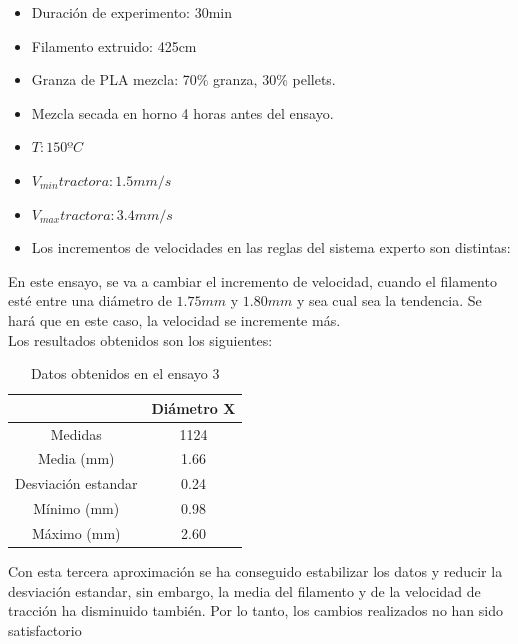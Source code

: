 \begin{itemize}
	\item{Duración de experimento: 30min}
	\item{Filamento extruido: 425cm}
	\item{Granza de PLA mezcla: 70\% granza, 30\% pellets.}
	\item{Mezcla secada en horno 4 horas antes del ensayo.}
	\item{$T: 150ºC$}
	\item{$V_{min} tractora: 1.5 mm/s$}
	\item{$V_{max} tractora: 3.4 mm/s$}
	\item{Los incrementos de velocidades en las reglas del sistema experto son distintas:}
\end{itemize}

En este ensayo, se va a cambiar el incremento de velocidad, cuando el filamento esté entre una diámetro de $1.75 mm$ y $1.80 mm$ y sea cual sea la tendencia. Se hará que en este caso, la velocidad se incremente más.\\

Los resultados obtenidos son los siguientes:

\begin{table}[H]
	\centering
	\begin{tabular}{cc}
		                    & Diámetro X \\ \hline
		Medidas             & 1124      \\
		Media (mm)          & 1.66       \\
		Desviación estandar & 0.24       \\
		Mínimo (mm)         & 0.98       \\
		Máximo (mm)         & 2.60      
	\end{tabular}
	\caption{Datos obtenidos en el ensayo 3}
	\label{tab:resl_ens3}
\end{table}

Con esta tercera aproximación se ha conseguido estabilizar los datos y reducir la desviación estandar, sin embargo, la media del filamento y de la velocidad de tracción ha disminuido también. Por lo tanto, los cambios realizados no han sido satisfactorio

